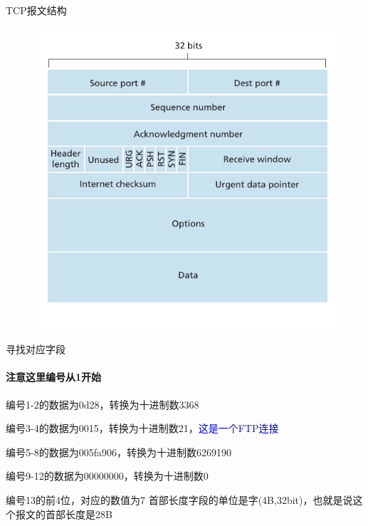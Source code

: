 \documentclass[handout]{beamer}
\begin{document}
\begin{frame}{TCP报文结构}
	\begin{figure}
			\includegraphics[scale=.8]{seg.pdf}
	\end{figure}
	
\end{frame}

\begin{frame}{寻找对应字段}
	\framesubtitle{注意这里编号从1开始}
	\begin{description}
		\item<2->[源端口号] 编号1-2的数据为0d28，转换为十进制数3368
		\item<3->[目的端口号] 编号3-4的数据为0015，转换为十进制数21，\textcolor{blue}{这是一个FTP连接}
		\item<4->[序列号] 编号5-8的数据为005fa906，转换为十进制数6269190
		\item<5->[确认号] 编号9-12的数据为00000000，转换为十进制数0
		\item<6->[首部长度] 编号13的前4位，对应的数值为7
		首部长度字段的单位是字(4B,32bit)，也就是说这个报文的首部长度是28B
		\end{description}
\end{frame}
\end{document}

